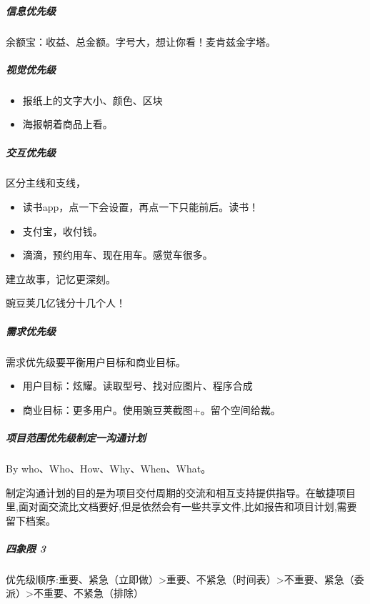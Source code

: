 \documentclass[letterpaper,11pt,english]{sphinxmanual}
\begin{document}
\subparagraph{信息优先级}
\label{\detokenize{chapter_knowledge/need_analysis:id9}}
余额宝：收益、总金额。字号大，想让你看！麦肯兹金字塔。


\subparagraph{视觉优先级}
\label{\detokenize{chapter_knowledge/need_analysis:id10}}\begin{itemize}
\item {} 
报纸上的文字大小、颜色、区块

\item {} 
海报朝着商品上看。

\end{itemize}


\subparagraph{交互优先级}
\label{\detokenize{chapter_knowledge/need_analysis:id11}}
区分主线和支线，
\begin{itemize}
\item {} 
读书app，点一下会设置，再点一下只能前后。读书！

\item {} 
支付宝，收付钱。

\item {} 
滴滴，预约用车、现在用车。感觉车很多。

\end{itemize}

建立故事，记忆更深刻。

豌豆荚几亿钱分十几个人！


\subparagraph{需求优先级}
\label{\detokenize{chapter_knowledge/need_analysis:id12}}
需求优先级要平衡用户目标和商业目标。
\begin{itemize}
\item {} 
用户目标：炫耀。读取型号、找对应图片、程序合成

\item {} 
商业目标：更多用户。使用豌豆荚截图+。留个空间给裁。

\end{itemize}


\subparagraph{项目范围优先级制定一沟通计划}
\label{\detokenize{chapter_knowledge/need_analysis:id13}}
By who、Who、How、Why、When、What。

制定沟通计划的目的是为项目交付周期的交流和相互支持提供指导。在敏捷项目里,面对面交流比文档要好,但是依然会有一些共享文件,比如报告和项目计划,需要留下档案。


\subparagraph{四象限 3\sphinxfootnotemark[470]}
\label{\detokenize{chapter_knowledge/need_analysis:id14}}%
\begin{footnotetext}[470]\sphinxAtStartFootnote
{}
%
\end{footnotetext}\ignorespaces 
优先级顺序:重要、紧急（立即做）>重要、不紧急（时间表）>不重要、紧急（委派）>不重要、不紧急（排除）
\end{document}
